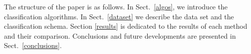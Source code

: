 The structure of the paper is as follows. In Sect.~\ref{algos}, we introduce the classification algorithms. In Sect.~\ref{dataset} we describe the data set and the
classification schema. Section \ref{results} is dedicated to the results of each method and their comparison. Conclusions and future developments are presented in
Sect.~\ref{conclusions}.
